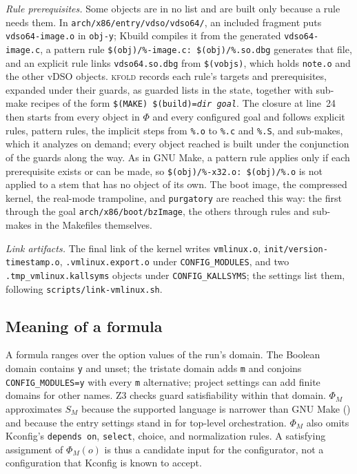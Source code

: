 \documentclass[acmsmall,screen,review]{acmart}
\newcommand{\tool}{\textsc{kfold}\xspace}
\begin{document}
\emph{Rule prerequisites.} Some objects are in no list and are built only because a rule needs them. In \texttt{arch/x86/entry/vdso/vdso64/}, an included fragment puts \texttt{vdso64-image.o} in \texttt{obj-y}; Kbuild compiles it from the generated \texttt{vdso64-image.c}, a pattern rule \texttt{\$(obj)/\%-image.c: \$(obj)/\%.so.dbg} generates that file, and an explicit rule links \texttt{vdso64.so.dbg} from \texttt{\$(vobjs)}, which holds \texttt{note.o} and the other vDSO objects. \tool records each rule's targets and prerequisites, expanded under their guards, as guarded lists in the state, together with sub-make recipes of the form \texttt{\$(MAKE) \$(build)=\textit{dir} \textit{goal}}. The closure at line~24 then starts from every object in $\Phi$ and every configured goal and follows explicit rules, pattern rules, the implicit steps from \texttt{\%.o} to \texttt{\%.c} and \texttt{\%.S}, and sub-makes, which it analyzes on demand; every object reached is built under the conjunction of the guards along the way. As in GNU Make, a pattern rule applies only if each prerequisite exists or can be made, so \texttt{\$(obj)/\%-x32.o: \$(obj)/\%.o} is not applied to a stem that has no object of its own. The boot image, the compressed kernel, the real-mode trampoline, and \texttt{purgatory} are reached this way: the first through the goal \texttt{arch/x86/boot/bzImage}, the others through rules and sub-makes in the Makefiles themselves.

\emph{Link artifacts.} The final link of the kernel writes \texttt{vmlinux.o}, \texttt{init/version-timestamp.o}, \texttt{.vmlinux.export.o} under \texttt{CONFIG\_MODULES}, and two \texttt{.tmp\_vmlinux.kallsyms} objects under \texttt{CONFIG\_KALLSYMS}; the settings list them, following \texttt{scripts/link-vmlinux.sh}.

\subsection{Meaning of a formula}
\label{sec:design:meaning}
A formula ranges over the option values of the run's domain. The Boolean domain contains \texttt{y} and unset; the tristate domain adds \texttt{m} and conjoins \texttt{CONFIG\_MODULES=y} with every \texttt{m} alternative; project settings can add finite domains for other names. Z3 checks guard satisfiability within that domain. $\Phi_M$ approximates $S_M$ because the supported language is narrower than GNU Make () and because the entry settings stand in for top-level orchestration. $\Phi_M$ also omits Kconfig's \texttt{depends on}, \texttt{select}, choice, and normalization rules. A satisfying assignment of $\Phi_M(o)$ is thus a candidate input for the configurator, not a configuration that Kconfig is known to accept.
\end{document}
